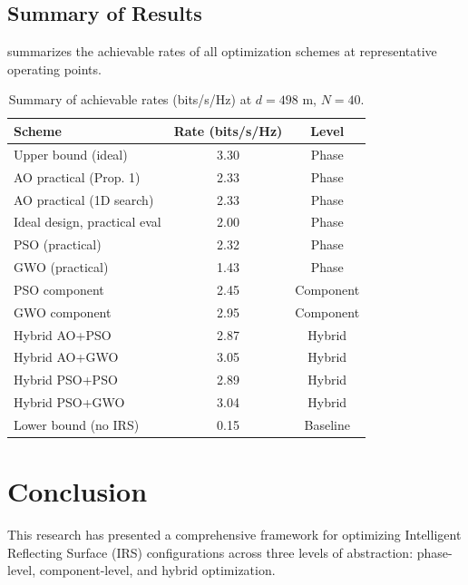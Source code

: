 \documentclass[12pt,a4paper]{article}
\begin{document}
\subsection{Summary of Results}

 summarizes the achievable rates of all optimization schemes at representative operating points.

\begin{table}[htbp]
    \centering
    \caption{Summary of achievable rates (bits/s/Hz) at $d = 498$ m, $N = 40$.}
    \label{tab:summary}
    \begin{tabular}{l c c}
        \toprule
        \textbf{Scheme} & \textbf{Rate (bits/s/Hz)} & \textbf{Level} \\
        \midrule
        Upper bound (ideal) & 3.30 & Phase \\
        AO practical (Prop. 1) & 2.33 & Phase \\
        AO practical (1D search) & 2.33 & Phase \\
        Ideal design, practical eval & 2.00 & Phase \\
        PSO (practical) & 2.32 & Phase \\
        GWO (practical) & 1.43 & Phase \\
        \midrule
        PSO component & 2.45 & Component \\
        GWO component & 2.95 & Component \\
        Hybrid AO+PSO & 2.87 & Hybrid \\
        Hybrid AO+GWO & 3.05 & Hybrid \\
        Hybrid PSO+PSO & 2.89 & Hybrid \\
        Hybrid PSO+GWO & 3.04 & Hybrid \\
        \midrule
        Lower bound (no IRS) & 0.15 & Baseline \\
        \bottomrule
    \end{tabular}
\end{table}


\section{Conclusion}
\label{sec:conclusion}

This research has presented a comprehensive framework for optimizing Intelligent Reflecting Surface (IRS) configurations across three levels of abstraction: phase-level, component-level, and hybrid optimization.
\end{document}
